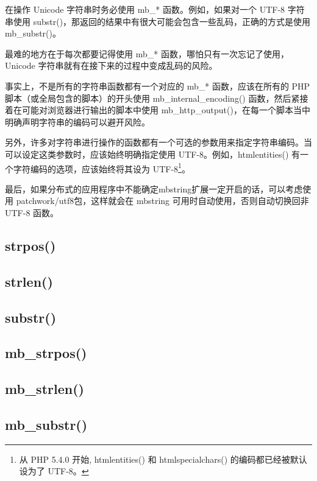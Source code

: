 在操作 Unicode 字符串时务必使用 mb\_* 函数。例如，如果对一个 UTF-8 字符串使用 substr()，那返回的结果中有很大可能会包含一些乱码，正确的方式是使用 mb\_substr()。

最难的地方在于每次都要记得使用 mb\_* 函数，哪怕只有一次忘记了使用，Unicode 字符串就有在接下来的过程中变成乱码的风险。

事实上，不是所有的字符串函数都有一个对应的 mb\_* 函数，应该在所有的 PHP 脚本（或全局包含的脚本）的开头使用 mb\_internal\_encoding() 函数，然后紧接着在可能对浏览器进行输出的脚本中使用 mb\_http\_output()，在每一个脚本当中明确声明字符串的编码可以避开风险。

另外，许多对字符串进行操作的函数都有一个可选的参数用来指定字符串编码。当可以设定这类参数时，应该始终明确指定使用 UTF-8。例如，htmlentities() 有一个字符编码的选项，应该始终将其设为 UTF-8\footnote{从 PHP 5.4.0 开始, htmlentities() 和 htmlspecialchars() 的编码都已经被默认设为了 UTF-8。}。

最后，如果分布式的应用程序中不能确定mbstring扩展一定开启的话，可以考虑使用 patchwork/utf8包，这样就会在 mbstring 可用时自动使用，否则自动切换回非 UTF-8 函数。

\subsection{strpos()}


\subsection{strlen()}


\subsection{substr()}

\subsection{mb\_strpos()}


\subsection{mb\_strlen()}


\subsection{mb\_substr()}






